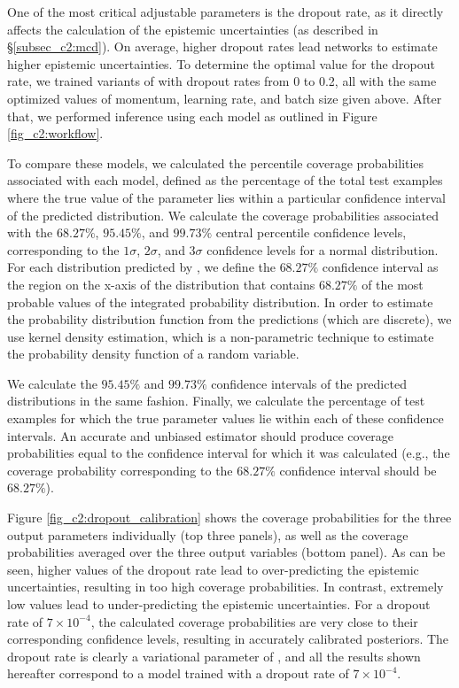 One of the most critical adjustable parameters is the dropout rate, as it directly affects the calculation of the epistemic uncertainties (as described in \S \ref{subsec_c2:mcd}). On average, higher dropout rates lead networks to estimate higher epistemic uncertainties. To determine the optimal value for the dropout rate, we trained variants of \gampen{} with dropout rates from 0 to 0.2, all with the same optimized values of momentum, learning rate, and batch size given above. After that, we performed inference using each model as outlined in Figure \ref{fig_c2:workflow}. 

To compare these models, we calculated the percentile coverage probabilities associated with each model, defined as the percentage of the total test examples where the true value of the parameter lies within a particular confidence interval of the predicted distribution. We calculate the coverage probabilities associated with the $68.27\%$, $95.45\%$, and $99.73\%$ central percentile confidence levels, corresponding to the $1\sigma$, $2\sigma$, and $3\sigma$ confidence levels for a normal distribution. For each distribution predicted by \gampen{}, we define the $68.27\%$ confidence interval as the region on the x-axis of the distribution that contains $68.27\%$ of the most probable values of the integrated probability distribution. In order to estimate the probability distribution function from the \gampen{} predictions (which are discrete), we use kernel density estimation, which is a non-parametric technique to estimate the probability density function of a random variable. 

We calculate the $95.45\%$ and $99.73\%$ confidence intervals of the predicted distributions in the same fashion. Finally, we calculate the percentage of test examples for which the true parameter values lie within each of these confidence intervals. An accurate and unbiased estimator should produce coverage probabilities equal to the confidence interval for which it was calculated (e.g., the coverage probability corresponding to the $68.27\%$ confidence interval should be $68.27\%$).

Figure \ref{fig_c2:dropout_calibration} shows the coverage probabilities for the three output parameters individually (top three panels), as well as the coverage probabilities averaged over the three output variables (bottom panel). As can be seen, higher values of the dropout rate lead to \gampen{} over-predicting the epistemic uncertainties, resulting in too high coverage probabilities. In contrast, extremely low values lead to \gampen{} under-predicting the epistemic uncertainties. For a dropout rate of $7\times10^{-4}$, the calculated coverage probabilities are very close to their corresponding confidence levels, resulting in accurately calibrated posteriors. The dropout rate is clearly a variational parameter of \gampen{}, and all the results shown hereafter correspond to a \gampen{} model trained with a dropout rate of $7\times10^{-4}$.

